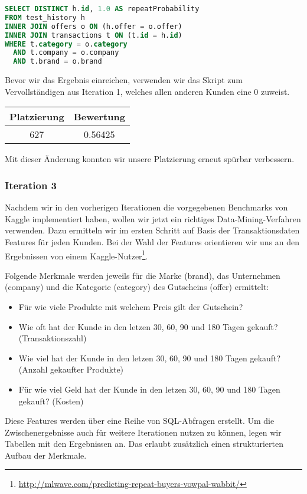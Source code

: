 \begin{lstlisting}[language=SQL]
SELECT DISTINCT h.id, 1.0 AS repeatProbability
FROM test_history h 
INNER JOIN offers o ON (h.offer = o.offer)
INNER JOIN transactions t ON (t.id = h.id)
WHERE t.category = o.category
  AND t.company = o.company
  AND t.brand = o.brand
\end{lstlisting}

Bevor wir das Ergebnis einreichen, verwenden wir das Skript zum Vervollständigen aus Iteration 1, welches allen anderen Kunden eine 0 zuweist.

\begin{tabular}{|c|c|}
	\hline \textbf{Platzierung} & \textbf{Bewertung} \\ 
	\hline 627 & 0.56425  \\ 
	\hline 
\end{tabular}

Mit dieser Änderung konnten wir unsere Platzierung erneut spürbar verbessern.

\subsubsection{Iteration 3}

Nachdem wir in den vorherigen Iterationen die vorgegebenen Benchmarks von Kaggle implementiert haben,
wollen wir jetzt ein richtiges Data-Mining-Verfahren verwenden. Dazu ermitteln wir im ersten Schritt
auf Basis der Transaktionsdaten Features für jeden Kunden. Bei der Wahl der Features orientieren
wir uns an den Ergebnissen von einem 
Kaggle-Nutzer\footnote{\url{http://mlwave.com/predicting-repeat-buyers-vowpal-wabbit/}}.

Folgende Merkmale werden jeweils für die Marke (brand), das Unternehmen (company) und die Kategorie (category)
des Gutscheins (offer) ermittelt:
\begin{itemize}
	\item Für wie viele Produkte mit welchem Preis gilt der Gutschein?
	\item Wie oft hat der Kunde in den letzen 30, 60, 90 und 180 Tagen gekauft? (Transaktionszahl)
	\item Wie viel hat der Kunde in den letzen 30, 60, 90 und 180 Tagen gekauft? (Anzahl gekaufter Produkte)
	\item Für wie viel Geld hat der Kunde in den letzen 30, 60, 90 und 180 Tagen gekauft? (Kosten)
\end{itemize}

Diese Features werden über eine Reihe von SQL-Abfragen erstellt. Um die Zwischenergebnisse auch für
weitere Iterationen nutzen zu können, legen wir Tabellen mit den Ergebnissen an. Das erlaubt zusätzlich
einen strukturierten Aufbau der Merkmale.

